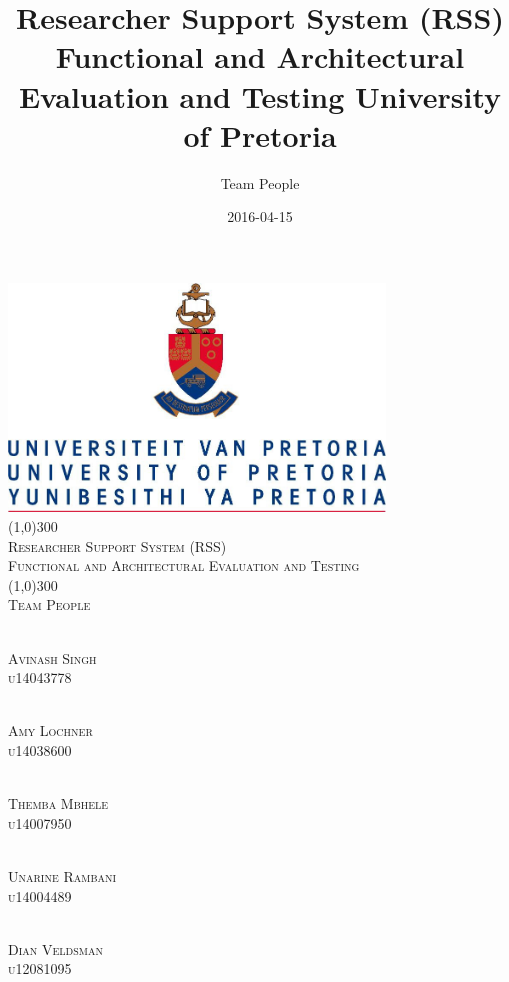 \documentclass{article}
\title{
	Researcher Support System (RSS)
	Functional and Architectural Evaluation and Testing
	University of Pretoria\\}
\date{2016-04-15}
\author{\huge Team People }
\begin{document}
	
	\begin{titlepage}
		\begin{center}
			\includegraphics[width=10cm]{UP.jpg}  \\
			[1cm]
			\line(1,0){300} \\
			[0.3cm]
			\textsc{\Large
				Researcher Support System (RSS)\\
				Functional and Architectural Evaluation and Testing
			}\\
			[0.1cm]
			\line(1,0){300} \\
			[0.7cm]
			\textsc{\Large
				Team People
			} \\
			
			
			
		\end{center}
		
		\begin{center}
			\begin{multicols}{2}
				\textsc{\large\\
					Avinash Singh\\ 
					u14043778\\ 
				}
				
				\textsc{\large\\
					Amy Lochner\\
					u14038600\\ 
				}
				
				\textsc{\large\\
					Themba Mbhele\\
					u14007950\\ 
				}
				
				\textsc{\large\\
					Unarine Rambani\\
					u14004489 \\
				}
				
				\textsc{\large\\
					Dian Veldsman\\
					u12081095\\
				}
				

\end{multicols}
\end{center}
\end{titlepage}
\end{document}
